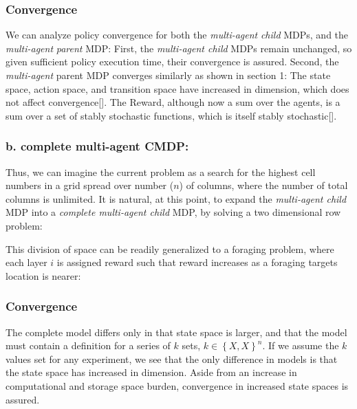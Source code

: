 \documentclass[]{article}
\begin{document}
\subsubsection{Convergence}\label{convergence-1}

We can analyze policy convergence for both the \emph{multi-agent}
\emph{child} MDPs, and the \emph{multi-agent} \emph{parent} MDP: First,
the \emph{multi-agent child} MDPs remain unchanged, so given sufficient
policy execution time, their convergence is assured. Second, the
\emph{multi-agent} parent MDP converges similarly as shown in section 1:
The state space, action space, and transition space have increased in
dimension, which does not affect convergence{[}{]}. The Reward, although
now a sum over the agents, is a sum over a set of stably stochastic
functions, which is itself stably stochastic{[}{]}.

\subsubsection{b. complete multi-agent
CMDP:}\label{b.-complete-multi-agent-cmdp}

Thus, we can imagine the current problem as a search for the highest
cell numbers in a grid spread over number (\(n\)) of columns, where the
number of total columns is unlimited. It is natural, at this point, to
expand the \emph{multi-agent child} MDP into a \emph{complete
multi-agent child} MDP, by solving a two dimensional row problem:

This division of space can be readily generalized to a foraging problem,
where each layer \(i\) is assigned reward such that reward increases as
a foraging targets location is nearer:

\subsubsection{}\label{section}

\subsubsection{Convergence}\label{convergence-2}

The complete model differs only in that state space is larger, and that
the model must contain a definition for a series of \(k\) sets,
\(k \in \left\{ X,X \right\}^{n}\). If we assume the \(k\) values set
for any experiment, we see that the only difference in models is that
the state space has increased in dimension. Aside from an increase in
computational and storage space burden, convergence in increased state
spaces is assured.
\end{document}
